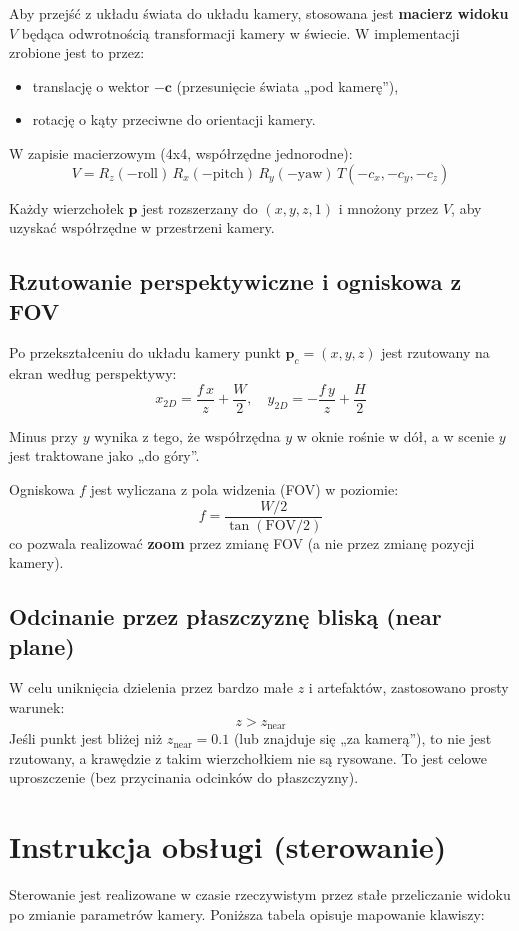 \documentclass[12pt,a4paper]{article}
\begin{document}
Aby przejść z układu świata do układu kamery, stosowana jest \textbf{macierz widoku} $V$ będąca odwrotnością transformacji kamery w świecie.
W implementacji zrobione jest to przez:
\begin{itemize}
    \item translację o wektor $-\mathbf{c}$ (przesunięcie świata „pod kamerę”),
    \item rotację o kąty przeciwne do orientacji kamery.
\end{itemize}

W zapisie macierzowym (4x4, współrzędne jednorodne):
\[
V = R_z(-\mathrm{roll})\,R_x(-\mathrm{pitch})\,R_y(-\mathrm{yaw})\,T(-c_x,-c_y,-c_z)
\]

Każdy wierzchołek $\mathbf{p}$ jest rozszerzany do $(x,y,z,1)$ i mnożony przez $V$, aby uzyskać współrzędne w przestrzeni kamery.

\subsection{Rzutowanie perspektywiczne i ogniskowa z FOV}
Po przekształceniu do układu kamery punkt $\mathbf{p}_c=(x,y,z)$ jest rzutowany na ekran według perspektywy:
\[
 x_{2D} = \frac{f\,x}{z} + \frac{W}{2},\quad
 y_{2D} = -\frac{f\,y}{z} + \frac{H}{2}
\]

Minus przy $y$ wynika z tego, że współrzędna $y$ w oknie rośnie w dół, a w scenie $y$ jest traktowane jako „do góry”.

Ogniskowa $f$ jest wyliczana z pola widzenia (FOV) w poziomie:
\[
 f = \frac{W/2}{\tan(\mathrm{FOV}/2)}
\]
co pozwala realizować \textbf{zoom} przez zmianę FOV (a nie przez zmianę pozycji kamery).

\subsection{Odcinanie przez płaszczyznę bliską (near plane)}
W celu uniknięcia dzielenia przez bardzo małe $z$ i artefaktów, zastosowano prosty warunek:
\[
 z > z_{\text{near}}
\]
Jeśli punkt jest bliżej niż $z_{\text{near}}=0{.}1$ (lub znajduje się „za kamerą”), to nie jest rzutowany, a krawędzie z takim wierzchołkiem nie są rysowane.
To jest celowe uproszczenie (bez przycinania odcinków do płaszczyzny).

\section{Instrukcja obsługi (sterowanie)}
Sterowanie jest realizowane w czasie rzeczywistym przez stałe przeliczanie widoku po zmianie parametrów kamery.
Poniższa tabela opisuje mapowanie klawiszy:
\end{document}
